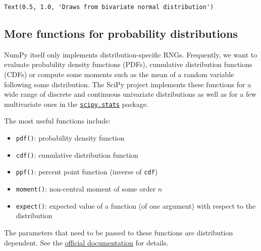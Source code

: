 \documentclass{scrartcl}
\makeatletter
\providecommand{\tightlist}{%
      \setlength{\itemsep}{0pt}\setlength{\parskip}{0pt}}
\newcommand{\boxspacing}{\kern\kvtcb@left@rule\kern\kvtcb@boxsep}
\newcommand{\prompt}[4]{
        {\ttfamily\llap{{\color{#2}[#3]:\hspace{3pt}#4}}\vspace{-\baselineskip}}
    }
\makeatother
\begin{document}
            \begin{tcolorbox}[breakable, size=fbox, boxrule=.5pt, pad at break*=1mm, opacityfill=0]
\prompt{Out}{outcolor}{13}{\boxspacing}
\begin{Verbatim}[commandchars=\\\{\}]
Text(0.5, 1.0, 'Draws from bivariate normal distribution')
\end{Verbatim}
\end{tcolorbox}
        
    \begin{center}
    \end{center}
    

\hypertarget{more-functions-for-probability-distributions}{%
\subsection{More functions for probability
distributions}\label{more-functions-for-probability-distributions}}

NumPy itself only implements distribution-specific RNGs. Frequently, we
want to evaluate probability density functions (PDFs), cumulative
distribution functions (CDFs) or compute some moments such as the mean
of a random variable following some distribution. The SciPy project
implements these functions for a wide range of discrete and continuous
univariate distributions as well as for a few multivariate ones in the
\href{https://docs.scipy.org/doc/scipy/reference/stats.html}{\texttt{scipy.stats}}
package.

The most useful functions include:

\begin{itemize}
\tightlist
\item
  \texttt{pdf()}: probability density function
\item
  \texttt{cdf()}: cumulative distribution function
\item
  \texttt{ppf()}: percent point function (inverse of \texttt{cdf})
\item
  \texttt{moment()}: non-central moment of some order \(n\)
\item
  \texttt{expect()}: expected value of a function (of one argument) with
  respect to the distribution
\end{itemize}

The parameters that need to be passed to these functions are
distribution dependent. See the
\href{https://docs.scipy.org/doc/scipy/reference/stats.html}{official
documentation} for details.
\end{document}
